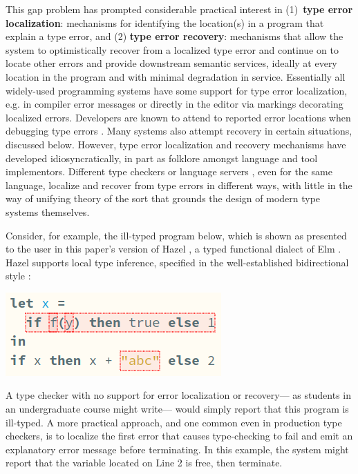 This gap problem has prompted considerable practical interest in 
(1)~\textbf{type error localization}: mechanisms for identifying the location(s) in a program that explain a type error, and 
(2) \textbf{type error recovery}: mechanisms that allow the system to optimistically recover from a localized type error 
and continue on to locate other errors and provide downstream semantic services, 
ideally at every location in the program and with minimal degradation in service.
Essentially all widely-used programming systems have some support for type error localization, 
e.g. in compiler error messages 
or directly in the editor via markings decorating localized errors. Developers are known to attend to reported error locations when debugging type errors \cite{DBLP:journals/jfp/JoostenBH93}.
Many systems also attempt recovery in certain situations, discussed below. 
However, type error localization and recovery mechanisms have developed idiosyncratically, 
in part as folklore amongst language and tool implementors. 
Different type checkers or language servers \cite{barros2022editing,bour2018merlin}, even for the same language, localize and recover from type errors in different ways, 
with little in the way of unifying theory of the sort that grounds the design of modern type systems themselves.

Consider, for example, the ill-typed program below, which is shown as presented to the user in
this paper's version of Hazel \cite{hazel}, a typed functional dialect of Elm \cite{elm}. Hazel  
supports local type inference, specified in the well-established bidirectional style \cite{Localinf,HazelnutPOPL,BidirTyping}:
\\\vspace{-5px}
\begin{center}
    \includegraphics[scale=0.5]{images/hazel-intro-screenshot-v3.png}
\end{center}

A type checker with no support for error localization or recovery---%
as students in an undergraduate course might write---%
would simply report that this program is ill-typed. 
A more practical approach, and one common even in production type checkers, 
is to localize the first error that causes type-checking to fail and emit an explanatory error message before terminating.
In this example, the system might report that the variable  located on Line 2 is free, then terminate.

